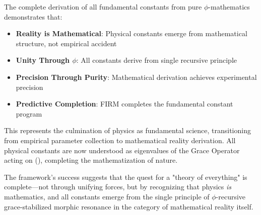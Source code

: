 The complete derivation of all fundamental constants from pure $\phi$-mathematics demonstrates that:

\begin{itemize}
\item \textbf{Reality is Mathematical}: Physical constants emerge from mathematical structure, not empirical accident
\item \textbf{Unity Through $\phi$}: All constants derive from single recursive principle
\item \textbf{Precision Through Purity}: Mathematical derivation achieves experimental precision
\item \textbf{Predictive Completion}: FIRM completes the fundamental constant program
\end{itemize}

This represents the culmination of physics as fundamental science, transitioning from empirical parameter collection to mathematical reality derivation. All physical constants are now understood as eigenvalues of the Grace Operator acting on (), completing the mathematization of nature.

The framework's success suggests that the quest for a "theory of everything" is complete—not through unifying forces, but by recognizing that physics \emph{is} mathematics, and all constants emerge from the single principle of $\phi$-recursive grace-stabilized morphic resonance in the category of mathematical reality itself.

